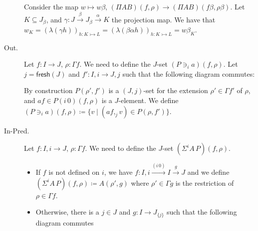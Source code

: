 \documentclass[english]{PaperTools/latex/lipics}
\newcommand\op[1]{∋_{#1}}
\newcommand\ip[3]{Σ^{#1} {#2}\,{#3}}
\def\fresh#1{\mathsf{fresh}(#1)}
\def\ie{\textit{i.e.}}
\begin{document}
\begin{description}
    Consider the map $w ↦ wβ$, $(Π A B)(f,ρ) → (Π A B)(fβ,ρβ)$.  Let
    $K ⊆ J_β$, and $γ : J \stackrel{β}{→} J_β \stackrel{α}{→} K$ the projection map.
    We have that
    $w_K = \left(λ(γh)\right)_{h : K ↣ L}
         = \left(λ(βαh)\right)_{h : K ↣ L}
         = wβ_K$.


  \item[\sc Out.]
    Let $f : I → J$, $ρ : Γf$.  We need to define the $J$-set $(P \op {i} a)(f,ρ)$.
    Let $j = \fresh J$ and $f' : I,i → J,j$ such that the following
    diagram commutes:


    By construction $P(ρ',f')$ is a $(J,j)$-set for the extension $ρ' ∈ Γf'$ of $ρ$,
    and $af ∈ P(i\,0)(f,ρ)$ is a $J$-element.
    We define $(P \op {i} a)(f,ρ) ≔ \{ v \mid (af ,_j v) ∈ P(ρ,f')\}$.

  \item[\sc In-Pred.]
    Let $f : I,i → J$, $ρ : Γf$.  We need to define the $J$-set $(\ip {i} A P)(f,ρ)$.

    \begin{itemize}
      \item If $f$ is not defined on $i$, we have $f : I,i \stackrel{(i\,0)}{→} I \stackrel{g}{→} J$
        and we define $(\ip {i} A P)(f,ρ) ≔ A(ρ',g)$
        where $ρ' ∈ Γg$ is the restriction of $ρ ∈ Γf$.

      \item Otherwise, there is a $j ∈ J$ and $g : I → J_{\{j\}}$ such that
        the following diagram commutes


\end{itemize}
\end{description}
\end{document}

